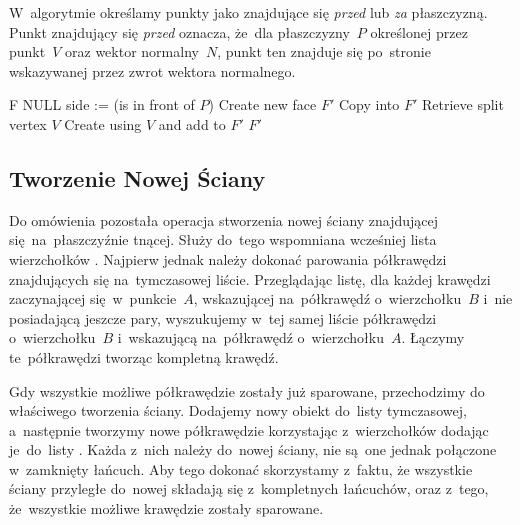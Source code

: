 \documentclass[skorowidz,autorrok,backref,xodstep,oswiadczenie]{wmimgr}
\begin{document}
W~algorytmie określamy punkty jako znajdujące się \emph{przed} lub \emph{za} płaszczyzną. Punkt znajdujący się \emph{przed} oznacza, że~dla płaszczyzny~$P$ określonej przez punkt~$V$ oraz wektor normalny~$N$, punkt ten znajduje się po~stronie wskazywanej przez zwrot wektora normalnego.

\begin{algorithm}
\caption{$CutFace(F, P)$}
\label{CutFace}
\begin{algorithmic}
        \RETURN F
    \ENDIF
        \RETURN NULL
    \ENDIF
    \STATE {}
    \STATE side := (is  in front of $P$)
    \STATE Create new face $F'$
    \REPEAT
            \STATE Copy  into $F'$
        \ENDIF
            \STATE Retrieve split vertex $V$
            \STATE Create  using $V$ and add to $F'$
            \STATE {}
        \ENDIF
        \STATE {}
    \RETURN $F'$
\end{algorithmic}
\end{algorithm}

\subsection{Tworzenie Nowej Ściany}

Do omówienia pozostała operacja stworzenia nowej ściany znajdującej się~na~płaszczyźnie tnącej. Służy do~tego wspomniana wcześniej lista wierzchołków . Najpierw jednak należy dokonać parowania półkrawędzi znajdujących się na~tymczasowej liście. Przeglądając listę, dla każdej krawędzi zaczynającej się~w~punkcie~$A$, wskazującej na~półkrawędź o~wierzchołku~$B$ i~nie posiadającą jeszcze pary, wyszukujemy w~tej samej liście półkrawędzi o~wierzchołku~$B$ i~wskazującą na~półkrawędź o~wierzchołku~$A$. Łączymy te~półkrawędzi tworząc kompletną krawędź.

Gdy wszystkie możliwe półkrawędzie zostały już sparowane, przechodzimy do właściwego tworzenia ściany. Dodajemy nowy obiekt  do~listy tymczasowej, a~następnie tworzymy nowe półkrawędzie korzystając z~wierzchołków  dodając je~do~listy . Każda z~nich należy do~nowej ściany, nie są~one jednak połączone w~zamknięty łańcuch. Aby tego dokonać skorzystamy z~faktu, że wszystkie ściany przyległe do~nowej składają się z~kompletnych łańcuchów, oraz z~tego, że~wszystkie możliwe krawędzie zostały sparowane.
\end{document}
